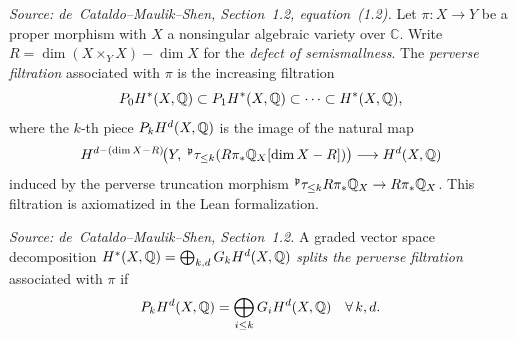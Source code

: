 \begin{definition}
  \label{def:PervFiltration}
  \uses{}
  \textit{Source: de~Cataldo--Maulik--Shen, Section~1.2, equation~(1.2).}
  Let \(\pi \colon X \to Y\) be a proper morphism with \(X\) a nonsingular
  algebraic variety over \(\mathbb{C}\).  Write
  \(R = \dim(X \times_Y X) - \dim X\) for the \emph{defect of semismallness}.
  The \emph{perverse filtration} associated with \(\pi\) is the increasing
  filtration
  \[
    P_0 H^*(X,\mathbb{Q}) \subset P_1 H^*(X,\mathbb{Q}) \subset \cdots \subset H^*(X,\mathbb{Q}),
  \]
  where the \(k\)-th piece \(P_k H^d(X,\mathbb{Q})\) is the image of the natural map
  \[
    H^{d-(\dim X - R)}\!\bigl(Y,\;
      {}^{\mathfrak{p}}\tau_{\leq k}(R\pi_* \mathbb{Q}_X[\dim X - R])\bigr)
    \longrightarrow H^d(X,\mathbb{Q})
  \]
  induced by the perverse truncation morphism
  \({}^{\mathfrak{p}}\tau_{\leq k} R\pi_* \mathbb{Q}_X \to R\pi_* \mathbb{Q}_X\).
  This filtration is axiomatized in the Lean formalization.
\end{definition}

\begin{definition}
  \label{def:PervSplitting}
  \textit{Source: de~Cataldo--Maulik--Shen, Section~1.2.}
  A graded vector space decomposition
  \(H^*(X,\mathbb{Q}) = \bigoplus_{k,d} G_k H^d(X,\mathbb{Q})\)
  \emph{splits the perverse filtration} associated with \(\pi\) if
  \[
    P_k H^d(X,\mathbb{Q}) = \bigoplus_{i \leq k} G_i H^d(X,\mathbb{Q}) \quad \forall\, k, d.
  \]
\end{definition}

